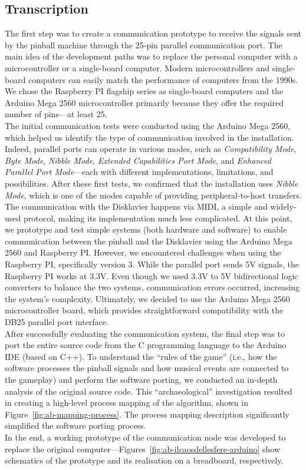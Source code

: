 \subsection*{Transcription}
The first step was to create a communication prototype to receive the signals sent by the pinball machine through the 25-pin parallel communication port. The main idea of the development paths was to replace the personal computer with a microcontroller or a single-board computer. Modern microcontrollers and single-board computers can easily match the performance of computers from the 1990s. We chose the Raspberry PI flagship series as single-board computers and the Arduino Mega 2560 microcontroller primarily because they offer the required number of pins—at least 25.\\
The initial communication tests were conducted using the Arduino Mega 2560, which helped us identify the type of communication involved in the installation. Indeed, parallel ports can operate in various modes, such as \textit{Compatibility Mode}, \textit{Byte Mode}, \textit{Nibble Mode}, \textit{Extended Capabilities Port Mode}, and \textit{Enhanced Parallel Port Mode}—each with different implementations, limitations, and possibilities. After these first tests, we confirmed that the installation uses \textit{Nibble Mode}, which is one of the modes capable of providing peripheral-to-host transfers. The communication with the Disklavier happens via MIDI, a simple and widely-used protocol, making its implementation much less complicated. At this point, we prototype and test simple systems (both hardware and software) to enable communication between the pinball and the Disklavier using the Arduino Mega 2560 and Raspberry PI. However, we encountered challenges when using the Raspberry PI, specifically version 3. While the parallel port sends 5V signals, the Raspberry PI works at 3.3V. Even though we used 3.3V to 5V bidirectional logic converters to balance the two systems, communication errors occurred, increasing the system's complexity. Ultimately, we decided to use the Arduino Mega 2560 microcontroller board, which provides straightforward compatibility with the DB25 parallel port interface.\\
After successfully evaluating the communication system, the final step was to port the entire source code from the C programming language to the Arduino IDE (based on C++). To understand the ``rules of the game'' (i.e., how the software processes the pinball signals and how musical events are connected to the gameplay) and perform the software porting, we conducted an in-depth analysis of the original source code. This ``archaeological'' investigation resulted in creating a high-level process mapping of the algorithm, shown in Figure~\ref{fig:ab-mapping-process}. The process mapping description significantly simplified the software porting process.\\
In the end, a working prototype of the communication node was developed to replace the original computer—Figures~\ref{fig:ab-ilcaosdellesfere-arduino} show schematics of the prototype and its realisation on a breadboard, respectively.

